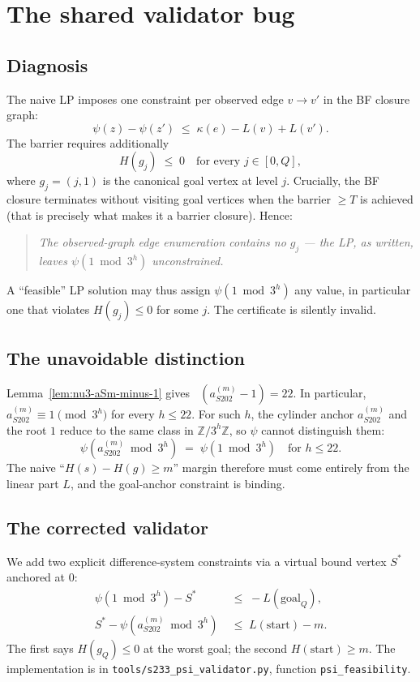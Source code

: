 \documentclass[11pt,a4paper]{article}
\theoremstyle{plain}
\theoremstyle{definition}
\newcommand{\ZZ}{\mathbb{Z}}
\newcommand{\aSat}{a_{S202}^{(m)}}
\DeclareMathOperator{\nuthree}{\nu_3}
\begin{document}
\section{The shared validator bug}\label{sec:bug}

\subsection{Diagnosis}

The naive LP imposes one constraint per observed edge
$v \to v'$ in the BF closure graph:
\[
  \psi(z) - \psi(z')
   \;\le\; \kappa(e) - L(v) + L(v').
\]
The barrier requires additionally
\[
  H(g_j) \;\le\; 0 \quad \text{for every } j \in [0, Q],
\]
where $g_j = (j, 1)$ is the canonical goal vertex at level $j$.
Crucially, the BF closure terminates without visiting goal
vertices when the barrier $\ge T$ is achieved (that is precisely
what makes it a barrier closure). Hence:
\begin{quote}
\emph{The observed-graph edge enumeration contains no
$g_j$ — the LP, as written, leaves
$\psi(1 \bmod 3^h)$ unconstrained.}
\end{quote}
A ``feasible'' LP solution may thus assign $\psi(1 \bmod 3^h)$ any
value, in particular one that violates $H(g_j) \le 0$ for some
$j$. The certificate is silently invalid.

\subsection{The unavoidable distinction}

Lemma~\ref{lem:nu3-aSm-minus-1} gives $\nuthree(\aSat - 1) = 22$.
In particular, $\aSat \equiv 1 \pmod{3^{h}}$ for every $h \le 22$.
For such $h$, the cylinder anchor $\aSat$ and the root $1$ reduce
to the same class in $\ZZ/3^h\ZZ$, so $\psi$ cannot distinguish
them:
\[
  \psi(\aSat \bmod 3^h) \;=\; \psi(1 \bmod 3^h)
  \quad \text{for } h \le 22.
\]
The naive ``$H(s) - H(g) \ge m$'' margin therefore must come
entirely from the linear part $L$, and the goal-anchor constraint
is binding.

\subsection{The corrected validator}

We add two explicit difference-system constraints via a virtual
bound vertex $S^{*}$ anchored at $0$:
\begin{align*}
  \psi(1 \bmod 3^h) - S^{*}
    &\;\le\; - L(\text{goal}_{Q}), \\
  S^{*} - \psi(\aSat \bmod 3^h)
    &\;\le\;   L(\text{start}) - m.
\end{align*}
The first says $H(g_Q) \le 0$ at the worst goal; the second
$H(\text{start}) \ge m$. The implementation is in
\texttt{tools/s233\_psi\_validator.py}, function
\texttt{psi\_feasibility}.
\end{document}
